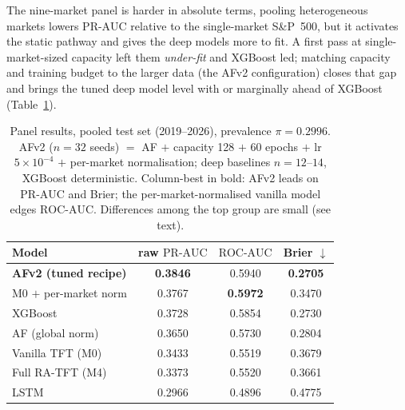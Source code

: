 \documentclass[11pt,a4paper]{article}
\newcommand{\prauc}{\mbox{PR-AUC}}
\newcommand{\rocauc}{\mbox{ROC-AUC}}
\begin{document}
The nine-market panel is harder in absolute terms, pooling heterogeneous
markets lowers $\prauc$ relative to the single-market S\&P~500, but it
activates the static pathway and gives the deep models more to fit. A first
pass at single-market-sized capacity left them \emph{under-fit} and XGBoost
led; matching capacity and training budget to the larger data (the AFv2
configuration) closes that gap and brings the tuned deep model level with or
marginally ahead of XGBoost (Table~\ref{tab:panel}).

\begin{table}[h]
\centering\small
\caption{Panel results, pooled test set (2019--2026), prevalence
$\pi=0.2996$. AFv2 ($n=32$ seeds) $=$ AF $+$ capacity 128 $+$ 60 epochs $+$ lr
$5\!\times\!10^{-4}$ $+$ per-market normalisation; deep baselines $n=12$--$14$,
XGBoost deterministic. Column-best in bold: AFv2 leads on $\prauc$ and Brier;
the per-market-normalised vanilla model edges $\rocauc$. Differences among the
top group are small (see text).}
\label{tab:panel}
\begin{tabular}{lccc}
\toprule
Model & raw $\prauc$ & $\rocauc$ & Brier $\downarrow$ \\
\midrule
\textbf{AFv2 (tuned recipe)}      & \textbf{0.3846} & 0.5940 & \textbf{0.2705} \\
M0 $+$ per-market norm            & 0.3767 & \textbf{0.5972} & 0.3470 \\
XGBoost                           & 0.3728 & 0.5854 & 0.2730 \\
AF (global norm)                  & 0.3650 & 0.5730 & 0.2804 \\
Vanilla TFT (M0)                  & 0.3433 & 0.5519 & 0.3679 \\
Full RA-TFT (M4)                  & 0.3373 & 0.5520 & 0.3661 \\
LSTM                              & 0.2966 & 0.4896 & 0.4775 \\
\bottomrule
\end{tabular}
\end{table}
\end{document}
